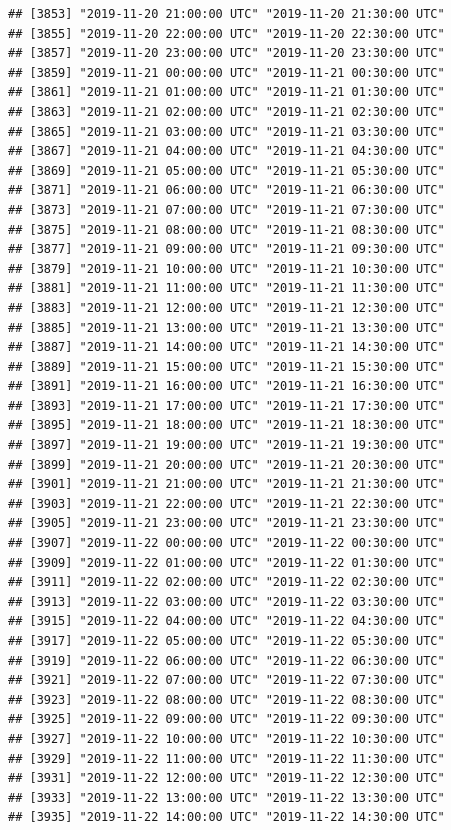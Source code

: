 \documentclass{article}\usepackage[]{graphicx}\usepackage[]{color}
\makeatletter
\newenvironment{kframe}{%
 \def\at@end@of@kframe{}%
 \ifinner\ifhmode%
  \def\at@end@of@kframe{\end{minipage}}%
  \begin{minipage}{\columnwidth}%
 \fi\fi%
 \def\FrameCommand##1{\hskip\@totalleftmargin \hskip-\fboxsep
 \colorbox{shadecolor}{##1}\hskip-\fboxsep
     \hskip-\linewidth \hskip-\@totalleftmargin \hskip\columnwidth}%
 \MakeFramed {\advance\hsize-\width
   \@totalleftmargin\z@ \linewidth\hsize
   \@setminipage}}%
 {\par\unskip\endMakeFramed%
 \at@end@of@kframe}
\newenvironment{knitrout}{}{} %
\makeatother
\begin{document}
\begin{knitrout}
\begin{kframe}
\begin{verbatim}
## [3853] "2019-11-20 21:00:00 UTC" "2019-11-20 21:30:00 UTC"
## [3855] "2019-11-20 22:00:00 UTC" "2019-11-20 22:30:00 UTC"
## [3857] "2019-11-20 23:00:00 UTC" "2019-11-20 23:30:00 UTC"
## [3859] "2019-11-21 00:00:00 UTC" "2019-11-21 00:30:00 UTC"
## [3861] "2019-11-21 01:00:00 UTC" "2019-11-21 01:30:00 UTC"
## [3863] "2019-11-21 02:00:00 UTC" "2019-11-21 02:30:00 UTC"
## [3865] "2019-11-21 03:00:00 UTC" "2019-11-21 03:30:00 UTC"
## [3867] "2019-11-21 04:00:00 UTC" "2019-11-21 04:30:00 UTC"
## [3869] "2019-11-21 05:00:00 UTC" "2019-11-21 05:30:00 UTC"
## [3871] "2019-11-21 06:00:00 UTC" "2019-11-21 06:30:00 UTC"
## [3873] "2019-11-21 07:00:00 UTC" "2019-11-21 07:30:00 UTC"
## [3875] "2019-11-21 08:00:00 UTC" "2019-11-21 08:30:00 UTC"
## [3877] "2019-11-21 09:00:00 UTC" "2019-11-21 09:30:00 UTC"
## [3879] "2019-11-21 10:00:00 UTC" "2019-11-21 10:30:00 UTC"
## [3881] "2019-11-21 11:00:00 UTC" "2019-11-21 11:30:00 UTC"
## [3883] "2019-11-21 12:00:00 UTC" "2019-11-21 12:30:00 UTC"
## [3885] "2019-11-21 13:00:00 UTC" "2019-11-21 13:30:00 UTC"
## [3887] "2019-11-21 14:00:00 UTC" "2019-11-21 14:30:00 UTC"
## [3889] "2019-11-21 15:00:00 UTC" "2019-11-21 15:30:00 UTC"
## [3891] "2019-11-21 16:00:00 UTC" "2019-11-21 16:30:00 UTC"
## [3893] "2019-11-21 17:00:00 UTC" "2019-11-21 17:30:00 UTC"
## [3895] "2019-11-21 18:00:00 UTC" "2019-11-21 18:30:00 UTC"
## [3897] "2019-11-21 19:00:00 UTC" "2019-11-21 19:30:00 UTC"
## [3899] "2019-11-21 20:00:00 UTC" "2019-11-21 20:30:00 UTC"
## [3901] "2019-11-21 21:00:00 UTC" "2019-11-21 21:30:00 UTC"
## [3903] "2019-11-21 22:00:00 UTC" "2019-11-21 22:30:00 UTC"
## [3905] "2019-11-21 23:00:00 UTC" "2019-11-21 23:30:00 UTC"
## [3907] "2019-11-22 00:00:00 UTC" "2019-11-22 00:30:00 UTC"
## [3909] "2019-11-22 01:00:00 UTC" "2019-11-22 01:30:00 UTC"
## [3911] "2019-11-22 02:00:00 UTC" "2019-11-22 02:30:00 UTC"
## [3913] "2019-11-22 03:00:00 UTC" "2019-11-22 03:30:00 UTC"
## [3915] "2019-11-22 04:00:00 UTC" "2019-11-22 04:30:00 UTC"
## [3917] "2019-11-22 05:00:00 UTC" "2019-11-22 05:30:00 UTC"
## [3919] "2019-11-22 06:00:00 UTC" "2019-11-22 06:30:00 UTC"
## [3921] "2019-11-22 07:00:00 UTC" "2019-11-22 07:30:00 UTC"
## [3923] "2019-11-22 08:00:00 UTC" "2019-11-22 08:30:00 UTC"
## [3925] "2019-11-22 09:00:00 UTC" "2019-11-22 09:30:00 UTC"
## [3927] "2019-11-22 10:00:00 UTC" "2019-11-22 10:30:00 UTC"
## [3929] "2019-11-22 11:00:00 UTC" "2019-11-22 11:30:00 UTC"
## [3931] "2019-11-22 12:00:00 UTC" "2019-11-22 12:30:00 UTC"
## [3933] "2019-11-22 13:00:00 UTC" "2019-11-22 13:30:00 UTC"
## [3935] "2019-11-22 14:00:00 UTC" "2019-11-22 14:30:00 UTC"

\end{verbatim}
\end{kframe}
\end{knitrout}
\end{document}
